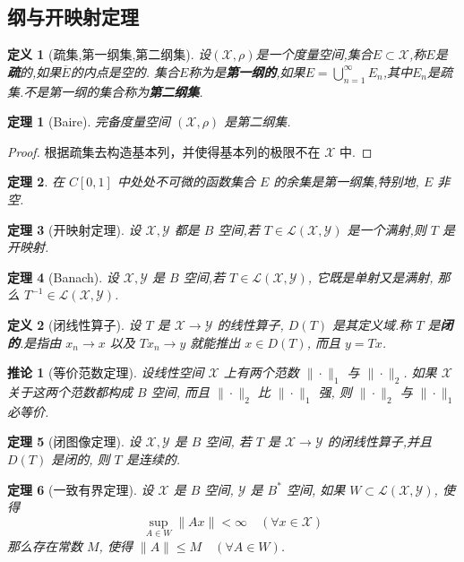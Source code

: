 \documentclass[12pt,a4paper]{article}
\newtheorem{thm}{定理}[subsection]  %
\newtheorem{corollary}{推论}[subsection] %
\newtheorem{definition}{定义}[subsection] %
\begin{document}
\subsection{纲与开映射定理}
\begin{definition}[疏集,第一纲集,第二纲集]
    设$(\mathscr{X},\rho )$是一个度量空间,集合$E \subset \mathscr{X}$,称$E$是\textbf{疏}的,如果$\overline{E}$的内点是空的.
    集合$E$称为是\textbf{第一纲的},如果$E = \bigcup_{n=1}^\infty E_n$,其中$E_n$是疏集.不是第一纲的集合称为\textbf{第二纲集}.
\end{definition}
\begin{thm}[Baire]
    完备度量空间 $(\mathscr{X}, \rho)$ 是第二纲集.
\end{thm}
\begin{proof}
    根据疏集去构造基本列，并使得基本列的极限不在 $\mathscr{X}$ 中.
\end{proof}
\begin{thm}
    在 $C[0,1]$ 中处处不可微的函数集合 $E$ 的余集是第一纲集,特别地, $E$ 非空.
\end{thm}
\begin{thm}[开映射定理]
    设 $\mathscr{X},\mathscr{Y}$ 都是 $B$ 空间,若 $T \in \mathscr{L}(\mathscr{X},\mathscr{Y})$ 是一个满射,则 $T$ 是开映射.
\end{thm}
\begin{thm}[Banach]
    设 $\mathscr{X},\mathscr{Y}$ 是 $B$ 空间,若 $ T \in \mathscr{L}(\mathscr{X}, \mathscr{Y})$, 它既是单射又是满射,
    那么 $T^{-1} \in \mathscr{L}(\mathscr{X}, \mathscr{Y})$.
\end{thm}
\begin{definition}[闭线性算子]
    设 $T$ 是 $\mathscr{X} \to \mathscr{Y}$ 的线性算子, $D(T)$ 是其定义域.称 $T$ 是\textbf{闭的}.是指由 $x_n \to x$ 以及 $Tx_n \to y$ 就能推出 $x \in D(T)$, 而且 $y = Tx$.
\end{definition}
\begin{corollary}[等价范数定理]
    设线性空间 $\mathscr{X}$ 上有两个范数 $\|\cdot\|_1$ 与 $\|\cdot\|_2$. 如果 $\mathscr{X}$ 关于这两个范数都构成 $B$ 空间, 
    而且 $\|\cdot\|_2$ 比 $\|\cdot\|_1$ 强, 则 $\|\cdot\|_2$ 与 $\|\cdot\|_1$ 必等价.
\end{corollary}
\begin{thm}[闭图像定理]
    设 $\mathscr{X}, \mathscr{Y}$ 是 $B$ 空间, 若 $T$ 是 $\mathscr{X} \to \mathscr{Y}$ 的闭线性算子,并且 $D(T)$ 是闭的, 则 $T$ 是连续的.
\end{thm}
\begin{thm}[一致有界定理]
    设 $\mathscr{X}$ 是 $B$ 空间, $\mathscr{Y}$ 是 $B^*$ 空间, 如果 $W \subset \mathscr{L}(\mathscr{X}, \mathscr{Y})$, 使得
    \[\underset{A \in W}{\sup} \|Ax\| < \infty \quad (\forall x \in \mathscr{X})\]
    那么存在常数 $M$, 使得 $\|A\| \leq M \quad (\forall A \in W)$.
\end{thm}
\end{document}
